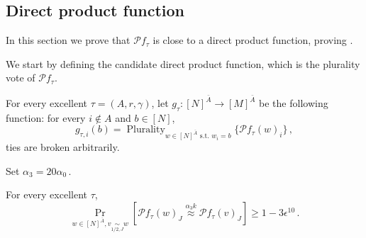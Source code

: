 \documentclass{toc}
\newcommand{\Prob}[2][]{\Pr_{{#1}}\left[#2\right]} %
\newcommand\f{f} %
\newcommand{\g}{g} %
\newcommand\bh{\mathcal{P}\f_\tau} %
\newcommand\neql[1]{\stackrel{{#1}}{ \approx}} %
\newcommand\cor[1]{\underset{\scriptscriptstyle#1}{\sim}} %
\DeclareMathOperator*\plur{\mathrm{Plurality}} %
\begin{document}
\subsection{Direct product function} \label{sec:local close to prod}
In this section we prove that $\bh$ is close to a direct product function, proving .

We start by defining the candidate direct product function, which is the plurality vote of $\bh$.
\begin{definition}\label{def:local dp}
	For every excellent $\tau=(A,r,\gamma)$, let $\g_\tau:[N]^{\bar{A}}\rightarrow[M]^{\bar{A}}$ be the following function: for every $i\notin A$ and $b\in[N]$,
	\[ \g_{{\tau},i}(b) = \plur_{w\in[N]^{\bar{A}} \text{ s.t. }w_i = b}\{\bh(w)_i \} \,,\]%
	ties are broken arbitrarily.
\end{definition}

Set $\alpha_3 = 20\alpha_0$\,.
\begin{claim}\label{claim:local avg consistent}
	For every excellent $\tau$,
	\[ \Prob[{w\in [N]^{\bar{A}},v\cor{1/2,J}{w}}]{\bh(w)_J \neql{\alpha_3 k} \bh(v)_J } \geq 1-3\epsilon^{10}\,. \]%
\end{claim}
\end{document}
